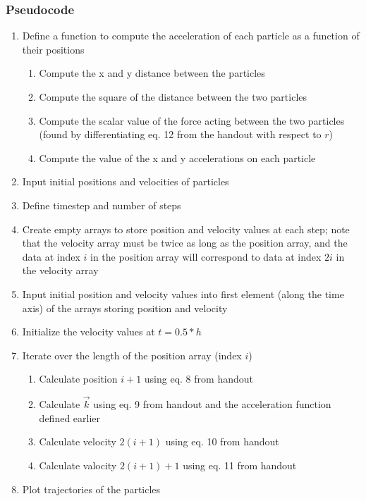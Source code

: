 \documentclass{article}
\begin{document}
\subsubsection{Pseudocode}

\begin{enumerate}
	\item Define a function to compute the acceleration of each particle as a function of their positions
	\begin{enumerate}[label*=\arabic*]
		\item Compute the x and y distance between the particles
		\item Compute the square of the distance between the two particles
		\item Compute the scalar value of the force acting between the two particles (found by differentiating eq. 12 from the handout with respect to $r$)
		\item Compute the value of the x and y accelerations on each particle
	\end{enumerate}
	\item Input initial positions and velocities of particles
	\item Define timestep and number of steps
	\item Create empty arrays to store position and velocity values at each step; note that the velocity array must be twice as long as the position array, and the data at index $i$ in the position array will correspond to data at index $2i$ in the velocity array
	\item Input initial position and velocity values into first element (along the time axis) of the arrays storing position and velocity
	\item Initialize the velocity values at $t=0.5*h$
	\item Iterate over the length of the position array (index $i$)
	\begin{enumerate}[label*=\arabic*]
		\item Calculate position $i+1$ using eq. 8 from handout
		\item Calculate $\vec{k}$ using eq. 9 from handout and the acceleration function defined earlier
		\item Calculate velocity $2(i+1)$ using eq. 10 from handout
		\item Calculate valocity $2(i+1)+1$ using eq. 11 from handout
	\end{enumerate}
	\item Plot trajectories of the particles
\end{enumerate}
\end{document}
